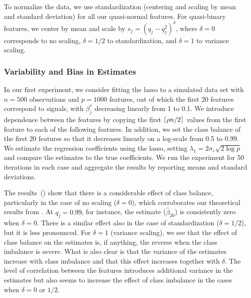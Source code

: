 To normalize the data, we use standardization (centering and scaling by mean and standard
deviation) for all our quasi-normal features. For quasi-binary features, we center by mean
and scale by \(s_j = (q_j-q_j^2)^\delta\), where \(\delta = 0\) corresponds to no scaling,
\(\delta = 1/2\) to standardization, and \(\delta = 1\) to variance scaling.

\subsubsection{Variability and Bias in Estimates}\label{sec:experiments-varbias}

In our first experiment, we consider fitting the lasso to a simulated data set with
\(n=500\) observations and \(p = \num{1000}\) features, out of which the first 20 features
correspond to signals, with \(\beta_j^*\) decreasing linearly from 1 to 0.1. We introduce
dependence between the features by copying the first \(\lceil \rho n/2 \rceil\) values from the
first feature to each of the following features. In addition, we set the class balance of
the first 20 features so that it decreases linearly on a log-scale from 0.5 to 0.99. We
estimate the regression coefficients using the lasso, setting \(\lambda_1 = 2
\sigma_\varepsilon \sqrt{2 \log p }\) and compare the estimates to the true coefficients.
We run the experiment for 50 iterations in each case and aggregate the results by reporting
means and standard deviations.

The results~() show that there is a considerable effect of
class balance, particularly in the case of no scaling (\(\delta = 0\)), which corroborates
our theoretical results from . At \(q_j=0.99\), for
instance, the estimate (\(\hat{\beta}_{20}\)) is consistently zero when \(\delta = 0\).
There is a similar effect also in the case of standardization (\(\delta = 1/2\)), but it is
less pronounced. For \(\delta=1\) (variance scaling), we see that the effect of class
balance on the estimates is, if anything, the reverse when the class imbalance is severe.
What is also clear is that the variance of the estimates increase with class imbalance and
that this effect increases together with \(\delta\). The level of correlation between the
features introduces additional variance in the estimates but also seems to increase the
effect of class imbalance in the cases when \(\delta = 0\) or \(1/2\).

